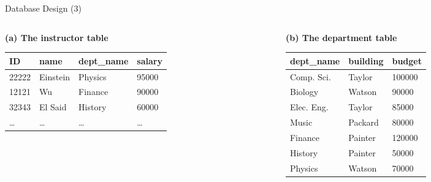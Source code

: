 \documentclass[aspectratio=169, xcolor=dvipsnames]{beamer}
\begin{document}
\begin{frame}{Database Design (3)}
    \begin{columns}
        \begin{column}{0.5\textwidth}
            \textbf{(a) The instructor table}
            \begin{center}
                \begin{adjustbox}{max width=\textwidth}
                \begin{tabular}{|l|l|l|l|}
                \hline
                \textbf{ID} & \textbf{name} & \textbf{dept\_name} & \textbf{salary} \\ \hline
                22222 & Einstein & Physics & 95000 \\ \hline
                12121 & Wu & Finance & 90000 \\ \hline
                32343 & El Said & History & 60000 \\ \hline
                \dots & \dots & \dots & \dots \\ \hline
                \end{tabular}
                \end{adjustbox}
            \end{center}
        \end{column}
        \begin{column}{0.5\textwidth}
            \textbf{(b) The department table}
            \begin{center}
                \begin{adjustbox}{max width=\textwidth}
                \begin{tabular}{|l|l|l|}
                \hline
                \textbf{dept\_name} & \textbf{building} & \textbf{budget} \\ \hline
                Comp. Sci. & Taylor & 100000 \\ \hline
                Biology & Watson & 90000 \\ \hline
                Elec. Eng. & Taylor & 85000 \\ \hline
                Music & Packard & 80000 \\ \hline
                Finance & Painter & 120000 \\ \hline
                History & Painter & 50000 \\ \hline
                Physics & Watson & 70000 \\ \hline
                \end{tabular}
                \end{adjustbox}
            \end{center}
        \end{column}
    \end{columns}
\end{frame}
\end{document}

